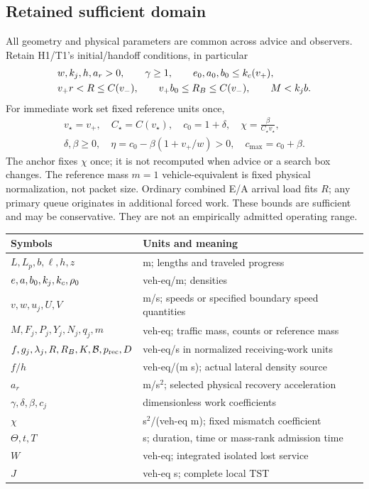 \subsection{Retained sufficient domain}
All geometry and physical parameters are common across advice and observers.
Retain H1/T1's initial/handoff conditions, in particular
\begin{align}
 &w,k_j,h,a_r>0,\qquad\gamma\geq1,\qquad
 e_0,a_0,b_0\leq k_c(v_+),\nonumber\\
 &v_+r<R\leq C(v_-),\qquad
 v_+b_0\leq R_B\leq C(v_-),\qquad M<k_jb. \label{eq:domain}
\end{align}
For immediate work set fixed reference units once,
\begin{equation}
 \begin{gathered}
 v_\star=v_+,\quad C_\star=C(v_\star),\quad
 c_0=1+\delta,\quad\chi=\frac\beta{C_\star v_\star},\\
 \delta,\beta\geq0,\quad
 \eta=c_0-\beta(1+v_+/w)>0,\quad c_{\max}=c_0+\beta.
 \end{gathered}
 \label{eq:workdomain}
\end{equation}
The anchor fixes $\chi$ once; it is not recomputed when advice or a search
box changes. The reference mass $m=1$ vehicle-equivalent is fixed physical
normalization, not packet size. Ordinary combined E/A arrival load fits
$R$; any primary queue originates in additional forced work. These bounds
are sufficient and may be conservative. They are not an empirically
admitted operating range.

\begin{center}
\begin{tabular}{>{\raggedright\arraybackslash}p{47mm}>{\raggedright\arraybackslash}p{99mm}}
\toprule
Symbols & Units and meaning\\
\midrule
$L,L_p,b,\ell,h,z$ & m; lengths and traveled progress\\
$e,a,b_0,k_j,k_c,\rho_0$ & veh-eq/m; densities\\
$v,w,u_j,U,V$ & m/s; speeds or specified boundary speed quantities\\
$M,F_j,P_j,Y_j,N_j,q_j,m$ & veh-eq; traffic mass, counts or reference mass\\
$f,g_j,\lambda_j,R,R_B,K,\mathcal B,p_{\mathrm{rec}},D$ & veh-eq/s in normalized receiving-work units\\
$f/h$ & veh-eq/(m s); actual lateral density source\\
$a_r$ & m/s$^2$; selected physical recovery acceleration\\
$\gamma,\delta,\beta,c_j$ & dimensionless work coefficients\\
$\chi$ & s$^2$/(veh-eq m); fixed mismatch coefficient\\
$\Theta,t,T$ & s; duration, time or mass-rank admission time\\
$W$ & veh-eq; integrated isolated lost service\\
$J$ & veh-eq s; complete local TST\\
\bottomrule
\end{tabular}
\end{center}

